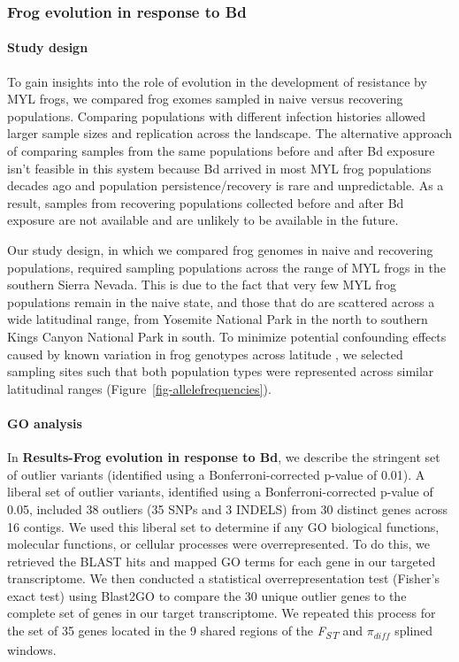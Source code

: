 \documentclass[
  letterpaper,
  DIV=11,
  numbers=noendperiod]{scrartcl}
\let\oldparagraph\paragraph
\renewcommand{\paragraph}[1]{\oldparagraph{#1}\mbox{}}
\begin{document}
\hypertarget{frog-evolution-in-response-to-bd-2}{%
\subsubsection{Frog evolution in response to
Bd}\label{frog-evolution-in-response-to-bd-2}}

\hypertarget{study-design}{%
\paragraph{Study design}\label{study-design}}

To gain insights into the role of evolution in the development of
resistance by MYL frogs, we compared frog exomes sampled in naive versus
recovering populations. Comparing populations with different infection
histories allowed larger sample sizes and replication across the
landscape. The alternative approach of comparing samples from the same
populations before and after Bd exposure isn't feasible in this system
because Bd arrived in most MYL frog populations decades ago and
population persistence/recovery is rare and unpredictable. As a result,
samples from recovering populations collected before and after Bd
exposure are not available and are unlikely to be available in the
future.

Our study design, in which we compared frog genomes in naive and
recovering populations, required sampling populations across the range
of MYL frogs in the southern Sierra Nevada. This is due to the fact that
very few MYL frog populations remain in the naive state, and those that
do are scattered across a wide latitudinal range, from Yosemite National
Park in the north to southern Kings Canyon National Park in south. To
minimize potential confounding effects caused by known variation in frog
genotypes across latitude \citep{byrne2023}, we selected sampling sites
such that both population types were represented across similar
latitudinal ranges (Figure~\ref{fig-allelefrequencies}).

\hypertarget{go-analysis}{%
\paragraph{GO analysis}\label{go-analysis}}

In \textbf{Results-Frog evolution in response to Bd}, we describe the
stringent set of outlier variants (identified using a
Bonferroni-corrected p-value of 0.01). A liberal set of outlier
variants, identified using a Bonferroni-corrected p-value of 0.05,
included 38 outliers (35 SNPs and 3 INDELS) from 30 distinct genes
across 16 contigs. We used this liberal set to determine if any GO
biological functions, molecular functions, or cellular processes were
overrepresented. To do this, we retrieved the BLAST hits and mapped GO
terms for each gene in our targeted transcriptome. We then conducted a
statistical overrepresentation test (Fisher's exact test) using Blast2GO
\citep{conesa2005} to compare the 30 unique outlier genes to the
complete set of genes in our target transcriptome. We repeated this
process for the set of 35 genes located in the 9 shared regions of the
\emph{F\textsubscript{ST}} and \(\pi_{diff}\) splined windows.
\end{document}
